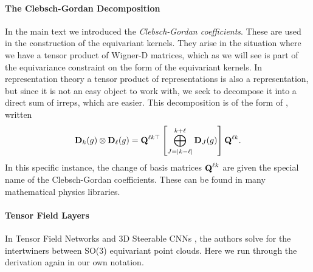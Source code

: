 \paragraph{The Clebsch-Gordan Decomposition}
In the main text we introduced the \emph{Clebsch-Gordan coefficients}. These are used in the construction of the equivariant kernels. They arise in the situation where we have a tensor product of Wigner-D matrices, which as we will see is part of the equivariance constraint on the form of the equivariant kernels. In representation theory a tensor product of representations is also a representation, but since it is not an easy object to work with, we seek to decompose it into a direct sum of irreps, which are easier. This decomposition is of the form of , written
\begin{align}
    \textbf{D}_k(g) \otimes \textbf{D}_\ell(g) = \textbf{Q}^{\ell k\top} \left [ \bigoplus_{J = |k - \ell|}^{k + \ell} \textbf{D}_J(g) \right ] \textbf{Q}^{\ell k}.
\end{align}
In this specific instance, the change of basis matrices $\textbf{Q}^{\ell k}$ are given the special name of the Clebsch-Gordan coefficients. These can be found in many mathematical physics libraries.

\paragraph{Tensor Field Layers}
In Tensor Field Networks \cite{ThomasSKYKR18} and 3D Steerable CNNs \cite{WeilerGWBC18}, the authors solve for the intertwiners between SO(3) equivariant point clouds. Here we run through the derivation again in our own notation.

